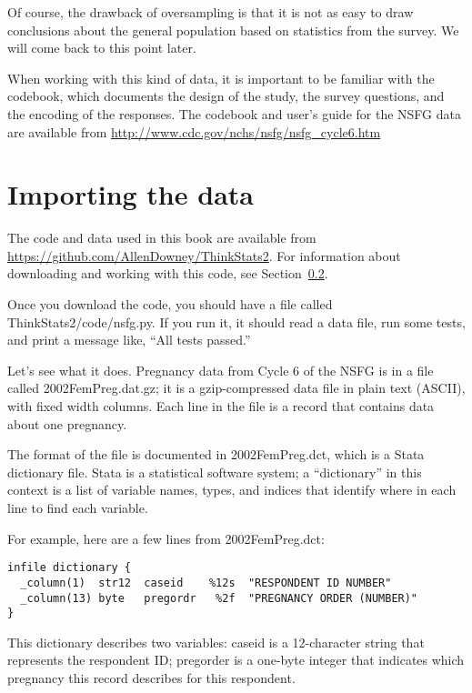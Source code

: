 \documentclass[]{book}
\begin{document}
Of course, the drawback of oversampling
is that it is not as easy to draw conclusions about the general
population based on statistics from the survey. We will come back to
this point later.

When working with this kind of data, it
is important to be familiar with the codebook, which documents the design of
the study, the survey questions, and the encoding of the responses. The
codebook and user's guide for the NSFG data are available from
\url{http://www.cdc.gov/nchs/nsfg/nsfg_cycle6.htm}

\hypertarget{importing-the-data}{%
\section{Importing the data}\label{importing-the-data}}

The code and data used in this book are
available from \url{https://github.com/AllenDowney/ThinkStats2}. For information about downloading and working
with this code, see Section~\href{thinkstats2001.html\#code}{0.2}.

Once you download the code, you should
have a file called ThinkStats2/code/nsfg.py. If you
run it, it should read a data file, run some tests, and print a message
like, ``All tests passed.''

Let's see what it does. Pregnancy data
from Cycle 6 of the NSFG is in a file called 2002FemPreg.dat.gz; it is a
gzip-compressed data file in plain text (ASCII), with fixed width
columns. Each line in the file is a record that contains data about one
pregnancy.

The format of the file is documented in
2002FemPreg.dct, which is a
Stata dictionary file. Stata is a statistical software system; a
``dictionary'' in this context is a list of variable names, types, and
indices that identify where in each line to find each variable.

For example, here are a few lines from
2002FemPreg.dct:

\begin{verbatim}
infile dictionary {
  _column(1)  str12  caseid    %12s  "RESPONDENT ID NUMBER"
  _column(13) byte   pregordr   %2f  "PREGNANCY ORDER (NUMBER)"
}
\end{verbatim}

This dictionary describes two variables:
caseid is a 12-character
string that represents the respondent ID; pregorder is a one-byte integer
that indicates which pregnancy this record describes for this
respondent.
\end{document}
